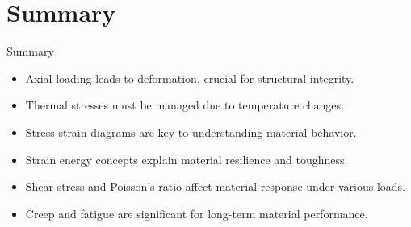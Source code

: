 \documentclass{beamer}
\begin{document}
\section{Summary}
\begin{frame}{Summary}
    \begin{itemize}
        \item Axial loading leads to deformation, crucial for structural integrity.
        \item Thermal stresses must be managed due to temperature changes.
        \item Stress-strain diagrams are key to understanding material behavior.
        \item Strain energy concepts explain material resilience and toughness.
        \item Shear stress and Poisson's ratio affect material response under various loads.
        \item Creep and fatigue are significant for long-term material performance.
    \end{itemize}
\end{frame}
\end{document}
